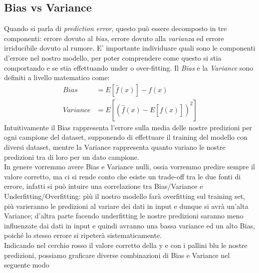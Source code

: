 \documentclass[a4paper,8pt]{article}
\newenvironment{Figure}
  {\par\medskip\noindent\minipage{\linewidth}}
  {\endminipage\par\medskip}
\begin{document}
\begin{multicols}{2}
\section{Bias vs Variance}
Quando si parla di \emph{prediction error}, questo può essere decomposto in tre componenti: errore dovuto al \emph{bias}, errore dovuto alla \emph{varianza} ed errore irriducibile dovuto al rumore. E' importante individuare quali sono le componenti d'errore nel nostro modello, per poter comprendere come questo si stia comportando e se stia effettuando under o over-fitting.
Il \emph{Bias} e la \emph{Variance} sono definiti a livello matematico come:
\begin{equation}
\begin{split}
Bias &= E[\hat{f}(x)]-f(x)\\
Variance &= E\left[\left(\hat{f}(x)-E[\hat{f}(x)]\right)^2\right]
\end{split}
\end{equation}
Intuitivamente il Bias rappresenta l'errore sulla media delle nostre predizioni per ogni campione del dataset, supponendo di effettuare il training del modello con diversi dataset, mentre la Variance rappresenta quanto variano le nostre predizioni tra di loro per un dato campione.\\
In genere vorremmo avere Bias e Variance nulli, ossia vorremmo predire sempre il valore corretto, ma ci si rende conto che esiste un trade-off tra le due fonti di errore, infatti si può intuire una correlazione tra Bias/Variance e Underfitting/Overfitting: più il nostro modello farà overfitting sul training set, più varieranno le predizioni al variare dei dati in input e dunque si avrà un'alta Variance; d'altra parte facendo underfitting le nostre predizioni saranno meno influenzate dai dati in input e quindi avranno una bassa variance ed un alto Bias, poiché lo stesso errore si ripeterà sistematicamente.\\
Indicando nel cerchio rosso il valore corretto della y e con i pallini blu le nostre predizioni, possiamo graficare diverse combinazioni di Bias e Variance nel seguente modo
\begin{Figure}
 \centering

\end{Figure}
\end{multicols}
\end{document}
